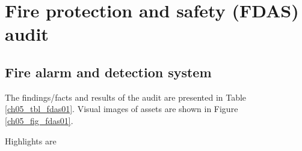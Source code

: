 
\section{Fire protection and safety (FDAS) audit}
\label{ch05fdas}
\subsection{Fire alarm and detection system} \label{fdas01}
The findings/facts and results of the audit are presented in Table \ref{ch05_tbl_fdas01}. Visual images of assets are shown in Figure \ref{ch05_fig_fdas01}. 

Highlights are

